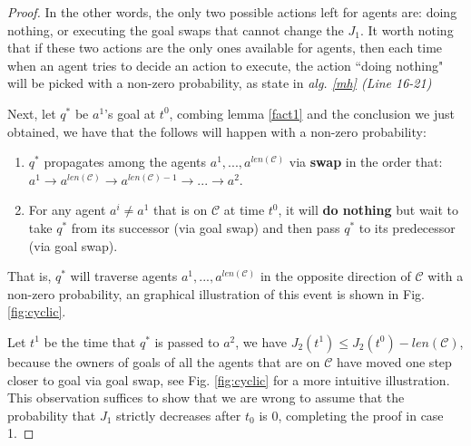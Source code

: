 \documentclass[journal]{IEEEtran}
\begin{document}
\begin{proof}
\noindent In the other words, the only two possible actions left for agents are: doing nothing, or executing the goal swaps that cannot change the $J_1$. It worth noting that if these two actions are the only ones available for agents, then each time when an agent tries to decide an action to execute, the action ``doing nothing" will be picked with a non-zero probability, as state in \textit{alg. \ref{mh} (\textit{Line 16-21})}


Next, let $q^*$ be $a^1$'s goal at $t^0$, combing lemma \ref{fact1} and the conclusion we just obtained, we have that the follows will happen with a non-zero probability:
\begin{enumerate}[label=\textbullet]
   \item $q^*$ propagates among the agents $a^1,..., a^{len(\mathcal{C})}$ via \textbf{swap} in the order that: $a^1\rightarrow a^{len(\mathcal{C})}\rightarrow a^{len(\mathcal{C}) - 1}\rightarrow ...\rightarrow a^2$.
   \item For any agent $a^i \neq a^1$ that is on $\mathcal{C}$ at time $t^0$, it will \textbf{do nothing} but wait to take $q^*$ from its successor (via goal swap) and then pass $q^*$ to its predecessor (via goal swap). 
\end{enumerate}

That is, $q^*$ will traverse agents $a^1, ..., a^{len(\mathcal{C})}$ in the opposite direction of $\mathcal{C}$ with a non-zero probability, an graphical illustration of this event is shown in Fig. \ref{fig:cyclic}. 


Let $t^1$ be the time that $q^*$ is passed to $a^2$, we have $J_2(t^1) \leq J_2(t^0) - len(\mathcal{C})$, because the owners of goals of all the agents that are on $\mathcal{C}$ have moved one step closer to goal via goal swap, see Fig. \ref{fig:cyclic} for a more intuitive illustration. This observation suffices to show that we are wrong to assume that the probability that $J_1$ strictly decreases after $t_0$ is 0, completing the proof in case 1.


\end{proof}
\end{document}
